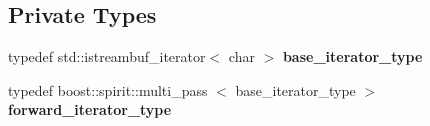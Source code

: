 \subsection*{\-Private \-Types}
\begin{DoxyCompactItemize}
\item 
\hypertarget{classhttp__server_1_1cRequest_ab55878881ea0fad5b7801a7d3e67bc6f}{
typedef \*
std\-::istreambuf\-\_\-iterator$<$ char $>$ {\bfseries base\-\_\-iterator\-\_\-type}}
\label{classhttp__server_1_1cRequest_ab55878881ea0fad5b7801a7d3e67bc6f}

\item 
\hypertarget{classhttp__server_1_1cRequest_a4c4ef5da2042acec5d8f9ff9f0a432c3}{
typedef \*
boost\-::spirit\-::multi\-\_\-pass\*
$<$ base\-\_\-iterator\-\_\-type $>$ {\bfseries forward\-\_\-iterator\-\_\-type}}
\label{classhttp__server_1_1cRequest_a4c4ef5da2042acec5d8f9ff9f0a432c3}

\end{DoxyCompactItemize}
